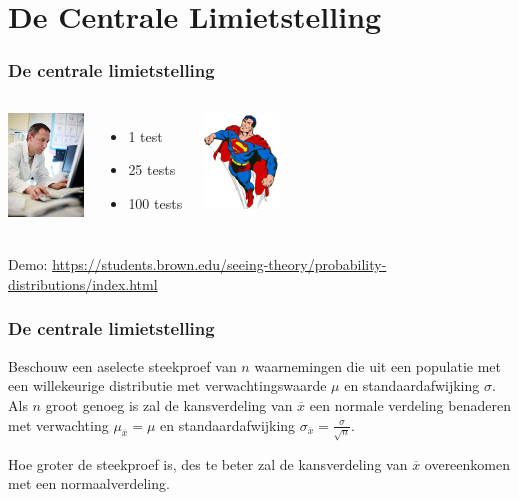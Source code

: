 \documentclass{beamer}
\begin{document}
\section{De Centrale Limietstelling}
\sectionframelogo{}


\begin{frame}
  \frametitle{De centrale limietstelling}


  \vfill

  \begin{columns}[c]
    \includegraphics[width=2cm]{img/les4-centrlimiet}
    \begin{itemize}
      \item 1 test
      \item 25 tests
      \item 100 tests
    \end{itemize}
    \includegraphics[width=2cm]{img/les2-hero-3}
  \end{columns}

\vfill
Demo: \url{https://students.brown.edu/seeing-theory/probability-distributions/index.html}

\end{frame}

\begin{frame}
  \frametitle{De centrale limietstelling}
  Beschouw een aselecte steekproef van $n$ waarnemingen die uit een populatie met een willekeurige distributie met verwachtingswaarde $\mu$ en standaardafwijking $\sigma$. Als $n$ groot genoeg is zal de kansverdeling van $\overline{x}$ een normale verdeling benaderen met verwachting $\mu_{\overline{x}} = \mu$ en standaardafwijking $\sigma_{\overline{x}} = \frac{\sigma}{\sqrt{n}}$.

\vspace{0.4cm}
  Hoe groter de steekproef is, des te beter zal de kansverdeling van $\overline{x}$ overeenkomen met een normaalverdeling.
\end{frame}
\end{document}
